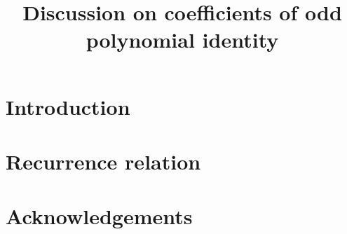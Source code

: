 \documentclass[10pt,letterpaper,oneside,reqno]{amsart}
\title[Discussion on coefficients of odd polynomial identity]
{Discussion on coefficients of odd polynomial identity}
\begin{document}
%        

    \maketitle


    \section{Introduction}\label{sec:introduction}
    


    \section{Recurrence relation}\label{sec:recurrence-relation}
    


%    

    \section{Acknowledgements}\label{sec:acknowledgements}
    

    
    
\end{document}

